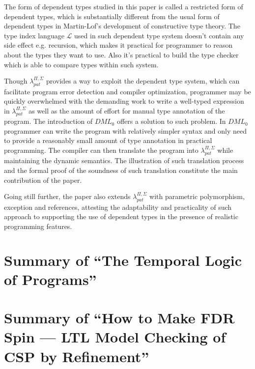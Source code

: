 \documentclass{llncs}
\newcommand{\dmlL}{$\mathcal{L}$}
\newcommand{\dmllamall}{$\lambda_{pat}^{\Pi,\Sigma}$}
\newcommand{\dmlzero}{$DML_0$}
\begin{document}
The form of dependent
types studied in this paper is called a restricted form of dependent types,
which is substantially different from the usual form of dependent types in
Martin-Lof’s development of constructive type theory. The type index language
\dmlL{} used in such dependent type system doesn't contain any side
effect e.g. recursion, which makes it practical for
programmer to reason about the types they want to use. Also it’s practical
to build the type checker which is able to compare types within such system.

Though \dmllamall{} provides a way to exploit the dependent type system, 
which can facilitate program error detection and
compiler optimization, programmer may be quickly overwhelmed with the
demanding work to write a well-typed expression in \dmllamall{} as well as the
amount of effort for manual type annotation of the program. The introduction
of \dmlzero{} offers a solution to such problem. In \dmlzero{} programmer can write the
program with relatively simpler syntax and only need to provide a reasonably
small amount of type annotation in practical programming. The compiler can
then translate the program into \dmllamall{} while maintaining the dynamic
semantics. The illustration of such translation process and the formal proof
of the soundness of such translation constitute the main contribution of
the paper.

Going still further, the paper also extends \dmllamall{} with 
parametric polymorphism, exception
and references, attesting the adaptability and practicality of such approach
to supporting the use of dependent types in the presence of realistic
programming features.


\newpage 
\section{Summary of ``The Temporal Logic of Programs''
  \cite{Pnueli1977Temporal}}
  \label{section:LTL}

\newpage 
\section{Summary of ``How to Make FDR Spin --- LTL Model Checking of CSP by
Refinement''\cite{Leuschel2001How}}
  \label{section:FDRSPIN}

\newpage
\end{document}
